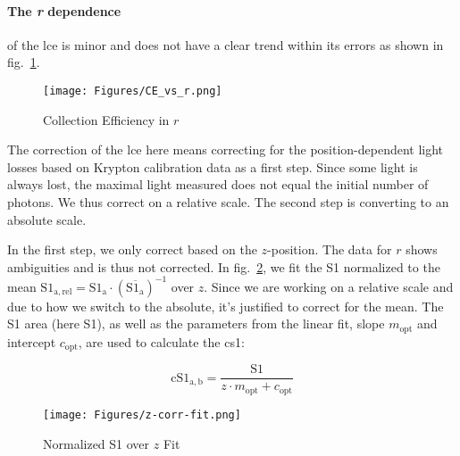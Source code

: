 \paragraph{The \emph{r} dependence} of the \gls{lce} is minor and does not have a clear trend within its errors as shown in fig.~\ref{fig:ce_vs_r}.

\begin{figure}
\centering
    \texttt{[image: Figures/CE\_vs\_r.png]}  %
\caption[Collection Efficiency in $ r $]{
    Collection Efficiency in $ r $
    }
\label{fig:ce_vs_r}
\end{figure}

The correction of the \gls{lce} here means correcting for the position-dependent light losses based on Krypton calibration data as a first step.
Since some light is always lost, the maximal light measured does not equal the initial number of photons.
We thus correct on a relative scale.
The second step is converting to an absolute scale.

In the first step, we only correct based on the $ z $-position.
The data for $ r $ shows ambiguities and is thus not corrected.
In fig.~\ref{fig:s1area_vs_z}, we fit the S1 normalized to the mean $ \mathrm{S1_{a,rel}} = \mathrm{S1_a} \cdot \left( \overline{\mathrm{S1_a}} \right)^{-1} $ over $ z $.  %
Since we are working on a relative scale and due to how we switch to the absolute, it's justified to correct for the mean.
The S1 area (here S1), as well as the parameters from the linear fit, slope $ m_\mathrm{opt} $ and intercept $ c_\mathrm{opt} $, are used to calculate the \gls{cs1}:

\begin{equation}
    \mathrm{cS1}_\mathrm{a,b} = \frac{ \mathrm{S1} }{ z \cdot m_\mathrm{opt} + c_\mathrm{opt} }
\end{equation}

\begin{figure}
\centering
    \texttt{[image: Figures/z-corr-fit.png]}  %
\caption[Normalized S1 over $ z $ Fit]{
    Normalized S1 over $ z $ Fit
    }
\label{fig:s1area_vs_z}
\end{figure}












